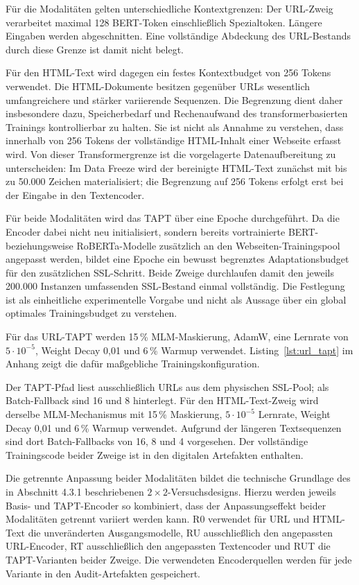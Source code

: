 Für die Modalitäten gelten unterschiedliche Kontextgrenzen: Der URL-Zweig verarbeitet
maximal 128 BERT-Token einschließlich Spezialtoken. Längere Eingaben werden abgeschnitten.
Eine vollständige Abdeckung des URL-Bestands durch diese Grenze ist damit nicht belegt.

Für den HTML-Text wird dagegen ein festes Kontextbudget von 256 Tokens verwendet. Die
HTML-Dokumente besitzen gegenüber URLs wesentlich umfangreichere und stärker variierende
Sequenzen. Die Begrenzung dient daher insbesondere dazu, Speicherbedarf und Rechenaufwand
des transformerbasierten Trainings kontrollierbar zu halten. Sie ist nicht als Annahme zu
verstehen, dass innerhalb von 256 Tokens der vollständige HTML-Inhalt einer Webseite erfasst
wird. Von dieser Transformergrenze ist die vorgelagerte Datenaufbereitung zu unterscheiden:
Im Data Freeze wird der bereinigte HTML-Text zunächst mit bis zu 50.000 Zeichen
materialisiert; die Begrenzung auf 256 Tokens erfolgt erst bei der Eingabe in den Textencoder.

Für beide Modalitäten wird das TAPT über eine Epoche durchgeführt. Da die Encoder dabei
nicht neu initialisiert, sondern bereits vortrainierte BERT- beziehungsweise RoBERTa-Modelle
zusätzlich an den Webseiten-Trainingspool angepasst werden, bildet eine Epoche ein bewusst
begrenztes Adaptationsbudget für den zusätzlichen SSL-Schritt. Beide Zweige durchlaufen damit
den jeweils 200.000 Instanzen umfassenden SSL-Bestand einmal vollständig. Die Festlegung ist
als einheitliche experimentelle Vorgabe und nicht als Aussage über ein global optimales
Trainingsbudget zu verstehen.

Für das URL-TAPT werden 15\,\% MLM-Maskierung, AdamW, eine Lernrate von
$5\cdot 10^{-5}$, Weight Decay 0,01 und 6\,\% Warmup verwendet.
Listing~\ref{lst:url_tapt} im Anhang zeigt die dafür maßgebliche Trainingskonfiguration.

Der TAPT-Pfad liest ausschließlich URLs aus dem physischen SSL-Pool; als Batch-Fallback
sind 16 und 8 hinterlegt. Für den HTML-Text-Zweig wird derselbe MLM-Mechanismus mit
15\,\% Maskierung, $5\cdot 10^{-5}$ Lernrate, Weight Decay 0,01 und 6\,\% Warmup
verwendet. Aufgrund der längeren Textsequenzen sind dort Batch-Fallbacks von 16, 8 und 4
vorgesehen. Der vollständige Trainingscode beider Zweige ist in den digitalen Artefakten
enthalten.

Die getrennte Anpassung beider Modalitäten bildet die technische Grundlage des in
Abschnitt 4.3.1 beschriebenen $2\times2$-Versuchsdesigns. Hierzu werden jeweils Basis- und
TAPT-Encoder so kombiniert, dass der Anpassungseffekt beider Modalitäten getrennt variiert
werden kann. R0 verwendet für URL und HTML-Text die unveränderten Ausgangsmodelle, RU
ausschließlich den angepassten URL-Encoder, RT ausschließlich den angepassten Textencoder
und RUT die TAPT-Varianten beider Zweige. Die verwendeten Encoderquellen werden für jede
Variante in den Audit-Artefakten gespeichert.

